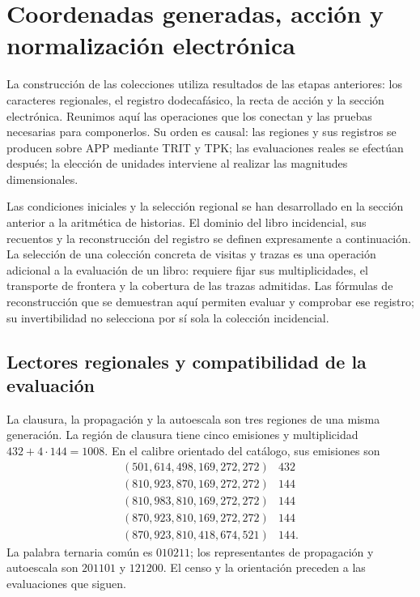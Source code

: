 \section{Coordenadas generadas, acción y normalización electrónica}
\label{vi:dep:seccion}\label{sec:k-registro}

La construcción de las colecciones utiliza resultados de las etapas anteriores:
los caracteres regionales, el registro dodecafásico, la recta de acción y la
sección electrónica. Reunimos aquí las operaciones que los conectan y las
pruebas necesarias para componerlos. Su orden es causal: las regiones y sus
registros se producen sobre APP mediante TRIT y TPK; las evaluaciones reales
se efectúan después; la elección de unidades interviene al realizar las
magnitudes dimensionales.

Las condiciones iniciales y la selección regional se han desarrollado en
la sección anterior a la aritmética de historias. El dominio del libro
incidencial, sus recuentos y la reconstrucción del registro se definen
expresamente a continuación. La selección de una colección concreta de
visitas y trazas es una operación adicional a la evaluación de un libro:
requiere fijar sus multiplicidades, el transporte de frontera y la
cobertura de las trazas admitidas. Las fórmulas de reconstrucción que se
demuestran aquí permiten evaluar y comprobar ese registro; su
invertibilidad no selecciona por sí sola la colección incidencial.

\subsection{Lectores regionales y compatibilidad de la evaluación}
\label{vi:dep:regiones}

La clausura, la propagación y la autoescala son tres regiones de una misma
generación. La región de clausura tiene cinco emisiones y multiplicidad
\(432+4\cdot144=1008\). En el calibre orientado del catálogo, sus emisiones
son
\[
\begin{array}{c|r}
(501,614,498,169,272,272)&432\\
(810,923,870,169,272,272)&144\\
(810,983,810,169,272,272)&144\\
(870,923,810,169,272,272)&144\\
(870,923,810,418,674,521)&144.
\end{array}
\]
La palabra ternaria común es \(010211\); los representantes de propagación
y autoescala son \(201101\) y \(121200\). El censo y la orientación
preceden a las evaluaciones que siguen.

